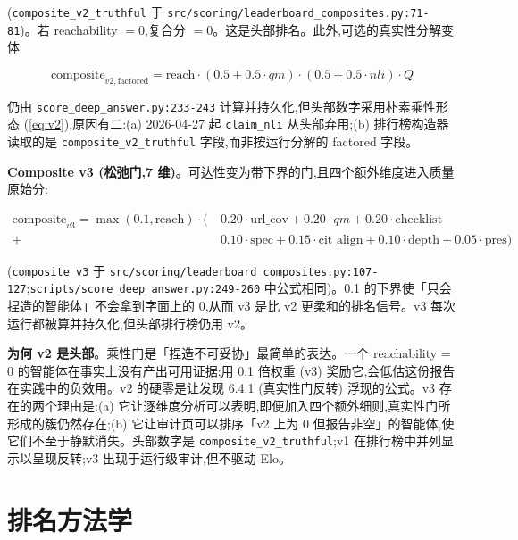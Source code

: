 \documentclass[UTF8,a4paper,12pt,oneside]{ctexart}
\begin{document}
(\texttt{composite\_v2\_truthful} 于 \texttt{src/scoring/leaderboard\_composites.py:71-81})。若 reachability \(= 0\),复合分 \(= 0\)。这是头部排名。此外,可选的真实性分解变体

\begin{equation}
\text{composite}_{v2,\text{factored}} = \text{reach} \cdot (0.5 + 0.5 \cdot qm) \cdot (0.5 + 0.5 \cdot nli) \cdot Q
\end{equation}

仍由 \texttt{score\_deep\_answer.py:233-243} 计算并持久化,但头部数字采用朴素乘性形态 (\ref{eq:v2}),原因有二:(a) 2026-04-27 起 \texttt{claim\_nli} 从头部弃用;(b) 排行榜构造器读取的是 \texttt{composite\_v2\_truthful} 字段,而非按运行分解的 factored 字段。

\textbf{Composite v3 (松弛门,7 维)}。可达性变为带下界的门,且四个额外维度进入质量原始分:

\begin{equation}
\begin{aligned}
\text{composite}_{v3} = \max(0.1, \text{reach}) \cdot \bigl(\ &0.20 \cdot \text{url\_cov} + 0.20 \cdot qm + 0.20 \cdot \text{checklist} \\
+\ &0.10 \cdot \text{spec} + 0.15 \cdot \text{cit\_align} + 0.10 \cdot \text{depth} + 0.05 \cdot \text{pres}\bigr)
\end{aligned}
\end{equation}

(\texttt{composite\_v3} 于 \texttt{src/scoring/leaderboard\_composites.py:107-127};\texttt{scripts/score\_deep\_answer.py:249-260} 中公式相同)。0.1 的下界使「只会捏造的智能体」不会拿到字面上的 0,从而 v3 是比 v2 更柔和的排名信号。v3 每次运行都被算并持久化,但头部排行榜仍用 v2。

\textbf{为何 v2 是头部}。乘性门是「捏造不可妥协」最简单的表达。一个 reachability = 0 的智能体在事实上没有产出可用证据;用 0.1 倍权重 (v3) 奖励它,会低估这份报告在实践中的负效用。v2 的硬零是让发现 6.4.1 (真实性门反转) 浮现的公式。v3 存在的两个理由是:(a) 它让逐维度分析可以表明,即便加入四个额外细则,真实性门所形成的簇仍然存在;(b) 它让审计页可以排序「v2 上为 0 但报告非空」的智能体,使它们不至于静默消失。头部数字是 \texttt{composite\_v2\_truthful};v1 在排行榜中并列显示以呈现反转;v3 出现于运行级审计,但不驱动 Elo。

\section{排名方法学}
\end{document}

